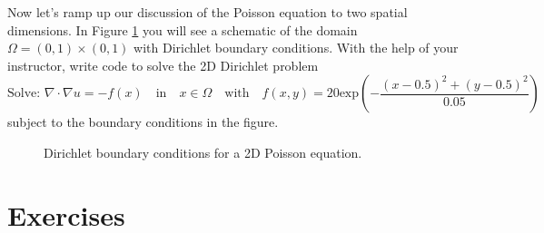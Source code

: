 \begin{problem}
    Now let's ramp up our discussion of the Poisson equation to two spatial dimensions.
    In Figure \ref{fig:2DPoisson_BC} you will see a schematic of the domain
    $\Omega=(0,1)\times (0,1)$ with Dirichlet boundary conditions.  With the help of your
    instructor, write code to solve the 2D Dirichlet problem
    \[ \text{Solve: } \nabla \cdot \nabla u = - f(x) \quad \text{in} \quad x \in \Omega \quad \text{with} \quad
    f(x,y) = 20\text{exp}\left( -\frac{(x-0.5)^2 + (y-0.5)^2}{0.05} \right) \]
    subject to the boundary conditions in the figure.

    \begin{figure}[ht!]
        \centering
        \caption{Dirichlet boundary conditions for a 2D Poisson equation.}
        \label{fig:2DPoisson_BC}
    \end{figure}
\end{problem}






\section{Exercises}

